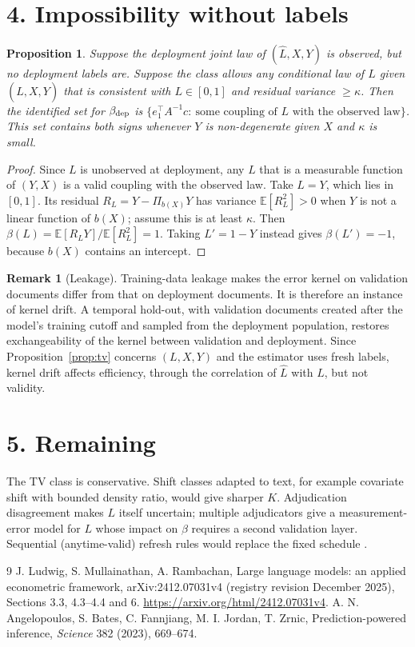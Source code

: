 \documentclass[11pt]{article}
\newtheorem{proposition}[theorem]{Proposition}
\theoremstyle{definition}
\newtheorem{remark}[theorem]{Remark}
\begin{document}
\section*{4. Impossibility without labels}
\begin{proposition}\label{prop:imp}
Suppose the deployment joint law of $(\widehat L,X,Y)$ is observed, but no deployment labels are. Suppose the class
allows any conditional law of $L$ given $(\widehat L,X,Y)$ that is consistent with $L\in[0,1]$ and residual variance
$\ge\kappa$. Then the identified set for $\beta_{\rm dep}$ is
$\{e_1^\top A^{-1}c:\ \text{some coupling of }L\text{ with the observed law}\}$. This set contains both signs whenever $Y$
is non-degenerate given $X$ and $\kappa$ is small.
\end{proposition}
\begin{proof}
Since $L$ is unobserved at deployment, any $L$ that is a measurable function of $(Y,X)$ is a valid coupling with the
observed law. Take $L=Y$, which lies in $[0,1]$. Its residual $R_L=Y-\Pi_{b(X)}Y$ has variance
$\mathbb E[R_L^2]>0$ when $Y$ is not a linear function of $b(X)$; assume this is at least $\kappa$. Then
$\beta(L)=\mathbb E[R_LY]/\mathbb E[R_L^2]=1$. Taking $L'=1-Y$ instead gives $\beta(L')=-1$, because $b(X)$ contains an
intercept.
\end{proof}
\begin{remark}[Leakage]
Training-data leakage makes the error kernel on validation documents differ from that on deployment documents. It is
therefore an instance of kernel drift. A temporal hold-out, with validation documents created after the model's training
cutoff and sampled from the deployment population, restores exchangeability of the kernel between validation and
deployment. Since Proposition~\ref{prop:tv} concerns $(L,X,Y)$ and the estimator uses fresh labels, kernel drift affects
efficiency, through the correlation of $\widehat L$ with $L$, but not validity.
\end{remark}

\section*{5. Remaining}
The TV class is conservative. Shift classes adapted to text, for example covariate shift with bounded density ratio,
would give sharper $K$. Adjudication disagreement makes $L$ itself uncertain; multiple adjudicators give a
measurement-error model for $L$ whose impact on $\beta$ requires a second validation layer. Sequential (anytime-valid)
refresh rules would replace the fixed schedule \cite{ludwig}.

\begin{thebibliography}{9}
 J. Ludwig, S. Mullainathan, A. Rambachan, Large language models: an applied econometric framework, arXiv:2412.07031v4 (registry revision December 2025), Sections 3.3, 4.3--4.4 and 6. \url{https://arxiv.org/html/2412.07031v4}.
 A. N. Angelopoulos, S. Bates, C. Fannjiang, M. I. Jordan, T. Zrnic, Prediction-powered inference, \emph{Science} 382 (2023), 669--674.
\end{thebibliography}
\end{document}
